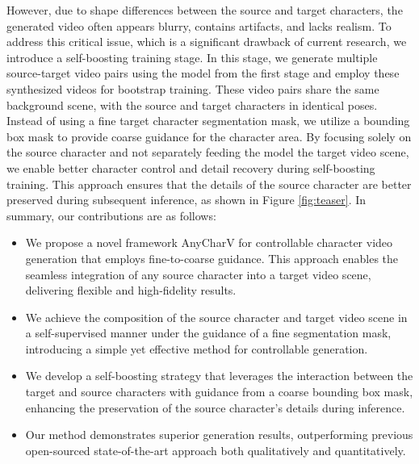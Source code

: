 However, due to shape differences between the source and target characters, the generated video often appears blurry, contains artifacts, and lacks realism.
To address this critical issue, which is a significant drawback of current research, we introduce a self-boosting training stage. 
In this stage, we generate multiple source-target video pairs using the model from the first stage and employ these synthesized videos for bootstrap training. 
These video pairs share the same background scene, with the source and target characters in identical poses. 
Instead of using a fine target character segmentation mask, we utilize a bounding box mask to provide coarse guidance for the character area. 
By focusing solely on the source character and not separately feeding the model the target video scene, we enable better character control and detail recovery during self-boosting training. 
This approach ensures that the details of the source character are better preserved during subsequent inference, as shown in Figure \ref{fig:teaser}.
In summary, our contributions are as follows:
\begin{itemize}
    \item We propose a novel framework AnyCharV for controllable character video generation that employs fine-to-coarse guidance. This approach enables the seamless integration of any source character into a target video scene, delivering flexible and high-fidelity results.
    \item We achieve the composition of the source character and target video scene in a self-supervised manner under the guidance of a fine segmentation mask, introducing a simple yet effective method for controllable generation.
    \item We develop a self-boosting strategy that leverages the interaction between the target and source characters with guidance from a coarse bounding box mask, enhancing the preservation of the source character's details during inference.
    \item Our method demonstrates superior generation results, outperforming previous open-sourced state-of-the-art approach both qualitatively and quantitatively.
\end{itemize}


